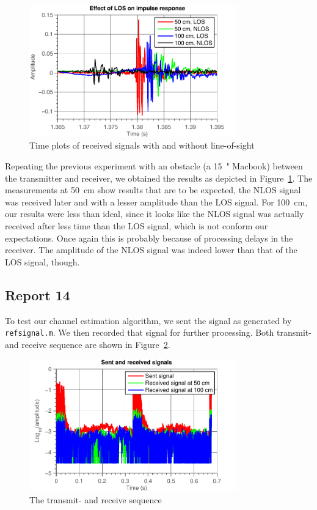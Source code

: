 \documentclass[11pt,titlepage]{report}
\begin{document}
\begin{figure}[H]
	\centering
	\includegraphics[width=0.8\textwidth]{../../deliverable-7-resources/figures/ass-1/report-11-12-13/ass-1-report-13-los-nlos.pdf}
	\caption{Time plots of received signals with and without line-of-sight}
	\label{fig:rep13-nlos}
\end{figure}

Repeating the previous experiment with an obstacle (a \SI{15}{"} Macbook) between the transmitter and receiver, we obtained the results as depicted in Figure~\ref{fig:rep13-nlos}. The measurements at \SI{50}{cm} show results that are to be expected, the NLOS signal was received later and with a lesser amplitude than the LOS signal. For \SI{100}{cm}, our results were less than ideal, since it looks like the NLOS signal was actually received after less time than the LOS signal, which is not conform our expectations. Once again this is probably because of processing delays in the receiver. The amplitude of the NLOS signal was indeed lower than that of the LOS signal, though.

\subsection{Report 14}
To test our channel estimation algorithm, we sent the signal as generated by \texttt{refsignal.m}. We then recorded that signal for further processing. Both transmit- and receive sequence are shown in Figure~\ref{fig:rep14-tx-rx}.

\begin{figure}[H]
	\centering
	\includegraphics[width=0.8\textwidth]{../../deliverable-7-resources/figures/ass-1/report-14-15/ass-1-report-14-sent-received.pdf}
	\caption{The transmit- and receive sequence}
	\label{fig:rep14-tx-rx}
\end{figure}
\end{document}
